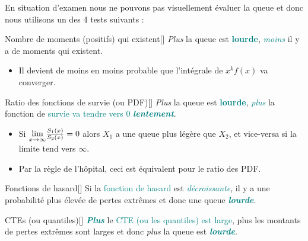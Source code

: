 \documentclass[french]{article}
\begin{document}
\begin{multicols*}{2}
En situation d'examen nous ne pouvons pas visuellement évaluer la queue et donc nous utilisons un des 4 tests suivants :
\begin{definitionGENERAL}{Nombre de moments (positifs) qui existent}[]
\textit{Plus} la queue est \textbf{\textbf{\textcolor{teal}{lourde}}}, \textit{\textcolor{teal}{moins}} il y a de moments qui existent.

\bigskip

\begin{itemize}
	\item	Il devient de moins en moins probable que l'intégrale de $x^{k}f(x)$ va converger.
\end{itemize}
\end{definitionGENERAL}

\begin{definitionGENERAL}{Ratio des fonctions de survie (ou PDF)}[]
\textit{Plus} la queue est \textbf{\textbf{\textcolor{teal}{lourde}}}, \textit{\textcolor{teal}{plus}} la fonction de \textcolor{teal}{survie va tendre vers 0 \textit{\textbf{lentement}}}.

\bigskip

\begin{itemize}
	\item	Si $\underset{x \rightarrow \infty}{\lim} \frac{S_{1}(x)}{S_{2}(x)}	=	0$ alors $X_{1}$ a une queue plus légère que $X_{2}$, et vice-versa si la limite tend vers $\infty$.
	\item	Par la règle de l'hôpital, ceci est équivalent pour le ratio des PDF.
\end{itemize}
\end{definitionGENERAL}

\begin{definitionGENERAL}{Fonctions de hasard}[]
Si la \textcolor{teal}{fonction de hasard} est \textit{\textcolor{teal}{décroissante}}, il y a une probabilité plus élevée de pertes extrêmes et donc une queue \textit{\textbf{\textcolor{teal}{lourde}}}.
\end{definitionGENERAL}

\begin{definitionGENERAL}{CTEs (ou quantiles)}[]
\textbf{\textit{\textcolor{teal}{Plus}}} le \textcolor{teal}{CTE (ou les quantiles) est large}, plus les montants de pertes extrêmes sont larges et donc \textit{plus} la queue est \textit{\textbf{\textcolor{teal}{lourde}}}.
\end{definitionGENERAL}




\end{multicols*}
\end{document}
